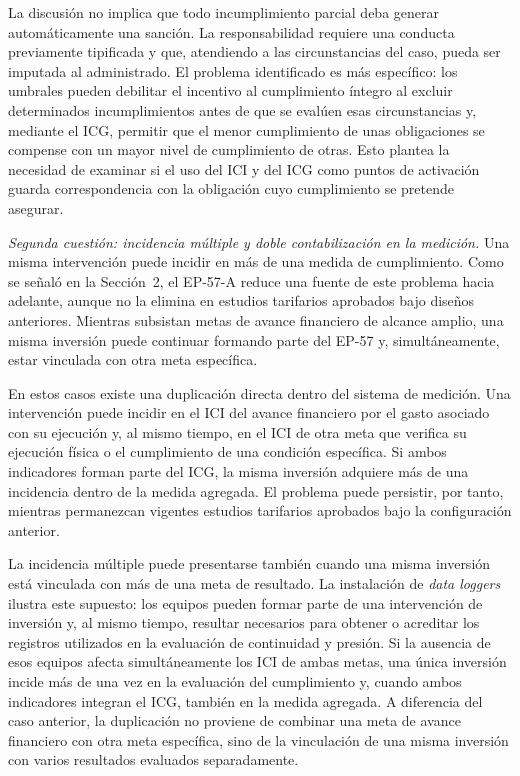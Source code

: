 La discusión no implica que todo incumplimiento parcial deba generar automáticamente una sanción. La responsabilidad requiere una conducta previamente tipificada y que, atendiendo a las circunstancias del caso, pueda ser imputada al administrado. El problema identificado es más específico: los umbrales pueden debilitar el incentivo al cumplimiento íntegro al excluir determinados incumplimientos antes de que se evalúen esas circunstancias y, mediante el ICG, permitir que el menor cumplimiento de unas obligaciones se compense con un mayor nivel de cumplimiento de otras. Esto plantea la necesidad de examinar si el uso del ICI y del ICG como puntos de activación guarda correspondencia con la obligación cuyo cumplimiento se pretende asegurar.

\textit{Segunda cuestión: incidencia múltiple y doble contabilización en la medición.} Una misma intervención puede incidir en más de una medida de cumplimiento. Como se señaló en la Sección~2, el EP-57-A reduce una fuente de este problema hacia adelante, aunque no la elimina en estudios tarifarios aprobados bajo diseños anteriores. Mientras subsistan metas de avance financiero de alcance amplio, una misma inversión puede continuar formando parte del EP-57 y, simultáneamente, estar vinculada con otra meta específica.

En estos casos existe una duplicación directa dentro del sistema de medición. Una intervención puede incidir en el ICI del avance financiero por el gasto asociado con su ejecución y, al mismo tiempo, en el ICI de otra meta que verifica su ejecución física o el cumplimiento de una condición específica. Si ambos indicadores forman parte del ICG, la misma inversión adquiere más de una incidencia dentro de la medida agregada. El problema puede persistir, por tanto, mientras permanezcan vigentes estudios tarifarios aprobados bajo la configuración anterior.

La incidencia múltiple puede presentarse también cuando una misma inversión está vinculada con más de una meta de resultado. La instalación de \textit{data loggers} ilustra este supuesto: los equipos pueden formar parte de una intervención de inversión y, al mismo tiempo, resultar necesarios para obtener o acreditar los registros utilizados en la evaluación de continuidad y presión. Si la ausencia de esos equipos afecta simultáneamente los ICI de ambas metas, una única inversión incide más de una vez en la evaluación del cumplimiento y, cuando ambos indicadores integran el ICG, también en la medida agregada. A diferencia del caso anterior, la duplicación no proviene de combinar una meta de avance financiero con otra meta específica, sino de la vinculación de una misma inversión con varios resultados evaluados separadamente.

